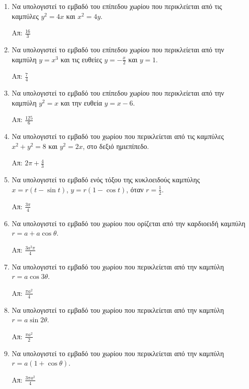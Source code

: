 


\everymath{\displaystyle}

\thispagestyle{empty}



\begin{center}
\end{center}

\vspace{\baselineskip}



\begin{enumerate}

	\item Να υπολογιστεί το εμβαδό του επίπεδου χωρίου που περικλείεται από τις καμπύλες 
		$ y^{2} = 4x $ και $ x^{2} = 4y $.

		\hfill Απ: $ \frac{16}{3} $

	\item Να υπολογιστεί το εμβαδό του επίπεδου χωρίου που περικλείεται από την καμπύλη  
		$ y = x^{3} $ και τις ευθείες $ y = -\frac{x}{2} $ και $ y=1 $.

		\hfill Απ: $ \frac{7}{4} $

	\item Να υπολογιστεί το εμβαδό του επίπεδου χωρίου που περικλείεται από την καμπύλη 
		$ y^{2} = x $ και την ευθεία $ y = x-6 $.

		\hfill Απ: $ \frac{125}{6} $

	\item Να υπολογιστεί το εμβαδό του χωρίου που περικλείεται από τις καμπύλες $
		x^{2} + y^{2} = 8 $ και $ y^{2} = 2x $, στο δεξιό ημιεπίπεδο.

		\hfill Απ: $ 2 \pi + \frac{4}{3} $

	\item Να υπολογιστεί το εμβαδό ενός τόξου της κυκλοειδούς καμπύλης $ x = r(t - \sin{t}) $, $
		y = r(1 - \cos{t}) $, όταν $ r = \frac{1}{2} $.

		\hfill Απ: $ \frac{3 \pi}{4} $

	\item Να υπολογιστεί το εμβαδό του χωρίου που ορίζεται από την καρδιοειδή καμπύλη
		$ r = a + a\cos{\theta} $.

		\hfill Απ: $ \frac{3a^{2}\pi}{4} $

	\item Να υπολογιστεί το εμβαδό του χωρίου που περικλείεται από την καμπύλη $
		r = a \cos{3\theta} $.

		\hfill Απ: $ \frac{\pi a^{2}}{4} $

	\item Να υπολογιστεί το εμβαδό του χωρίου που περικλείεται από την καμπύλη $
		r = a \sin{2\theta} $.

		\hfill Απ: $ \frac{\pi a^{2}}{2} $

	\item Να υπολογιστεί το εμβαδό του χωρίου που περικλείεται από την καμπύλη $
		r = a (1+\cos{\theta}) $.

		\hfill Απ: $ \frac{3\pi a^{2}}{4} $

\end{enumerate}





